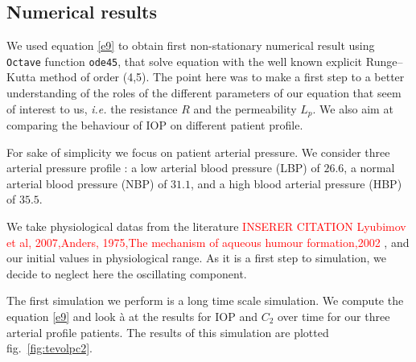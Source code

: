 \subsection{Numerical results}
We used equation \eqref{e9} to obtain first non-stationary numerical result using \texttt{Octave} function \texttt{ode45}, that solve equation with the well known explicit Runge–Kutta method of order (4,5).  The point here was to make a first step to a better understanding of the roles of the different parameters of our equation that seem of interest to us, \textit{i.e.} the resistance $R$ and the permeability $L_p$. We also aim at comparing the behaviour of IOP on different patient profile. 

For sake of simplicity we focus on patient arterial pressure. We consider three arterial pressure profile : a low arterial blood pressure  (LBP) of $26.6$, a normal arterial blood pressure (NBP) of $31.1$, and a high blood arterial pressure (HBP) of $35.5$.

We take physiological datas from the literature \textcolor{red}{INSERER CITATION Lyubimov et al, 2007,Anders, 1975,The mechanism of aqueous humour
formation,2002 \cite{??}}, and our initial values in physiological range. As it is a first step to simulation, we decide to neglect here the oscillating component. 

The first simulation we perform is a long time scale simulation. We compute the equation \eqref{e9} and look à at the results for IOP and $C_2$ over time for our three arterial profile patients. The results of this simulation are plotted fig.~\ref{fig:tevolpc2}.

